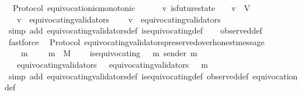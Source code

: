\begin{isabellebody}
\endisatagproof
{\isafoldproof}%
%
\isadelimproof
\isanewline
%
\endisadelimproof
\isanewline
\isanewline
{}\isamarkupfalse%
\ {\isacharparenleft}\ Protocol{\isacharparenright}\ equivocation{\isacharunderscore}is{\isacharunderscore}monotonic\ {\isacharcolon}\isanewline
\ \ {\isachardoublequoteopen}{\isasymforall}\ {\isasymsigma}\ {\isasymsigma}{\isacharprime}\ v{\isachardot}\ is{\isacharunderscore}future{\isacharunderscore}state\ {\isacharparenleft}{\isasymsigma}{\isacharcomma}\ {\isasymsigma}{\isacharprime}{\isacharparenright}\ {\isasymand}\ v\ {\isasymin}\ V\isanewline
\ \ {\isasymlongrightarrow}\ v\ {\isasymin}\ equivocating{\isacharunderscore}validators\ {\isasymsigma}\isanewline
\ \ {\isasymlongrightarrow}\ v\ {\isasymin}\ equivocating{\isacharunderscore}validators\ {\isasymsigma}{\isacharprime}{\isachardoublequoteclose}\isanewline
%
\isadelimproof
\ \ %
\endisadelimproof
%
\isatagproof
{}\isamarkupfalse%
\ {\isacharparenleft}simp\ add{\isacharcolon}\ equivocating{\isacharunderscore}validators{\isacharunderscore}def\ is{\isacharunderscore}equivocating{\isacharunderscore}def{\isacharparenright}\isanewline
\ \ \isamarkupfalse%
\ observed{\isacharunderscore}def\ \isamarkupfalse%
\ fastforce%
\endisatagproof
{\isafoldproof}%
%
\isadelimproof
\isanewline
%
\endisadelimproof
\isanewline
{}\isamarkupfalse%
\ {\isacharparenleft}\ Protocol{\isacharparenright}\ equivocating{\isacharunderscore}validators{\isacharunderscore}preserved{\isacharunderscore}over{\isacharunderscore}honest{\isacharunderscore}message\ {\isacharcolon}\isanewline
\ \ {\isachardoublequoteopen}{\isasymforall}\ {\isasymsigma}\ m{\isachardot}\ {\isasymsigma}\ {\isasymin}\ {\isasymSigma}\ {\isasymand}\ m\ {\isasymin}\ M\isanewline
\ \ {\isasymlongrightarrow}\ {\isasymnot}\ is{\isacharunderscore}equivocating\ {\isacharparenleft}{\isasymsigma}\ {\isasymunion}\ {\isacharbraceleft}m{\isacharbraceright}{\isacharparenright}\ {\isacharparenleft}sender\ m{\isacharparenright}\isanewline
\ \ {\isasymlongrightarrow}\ equivocating{\isacharunderscore}validators\ {\isasymsigma}\ {\isacharequal}\ equivocating{\isacharunderscore}validators\ {\isacharparenleft}{\isasymsigma}\ {\isasymunion}\ {\isacharbraceleft}m{\isacharbraceright}{\isacharparenright}{\isachardoublequoteclose}\isanewline
%
\isadelimproof
\ \ %
\endisadelimproof
%
\isatagproof
{}\isamarkupfalse%
\ {\isacharparenleft}simp\ add{\isacharcolon}\ equivocating{\isacharunderscore}validators{\isacharunderscore}def\ is{\isacharunderscore}equivocating{\isacharunderscore}def\ observed{\isacharunderscore}def\ equivocation{\isacharunderscore}def{\isacharparenright}\isanewline

\end{isabellebody}
